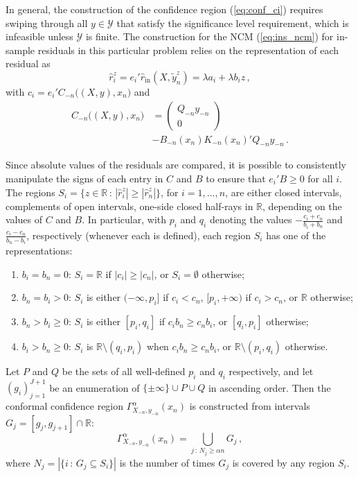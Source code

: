 \documentclass[a4paper,14pt]{extarticle}
\newcommand{\Ycal}{\mathcal{Y}}
\newcommand{\Real}{\mathbb{R}}
\begin{document}
In general, the construction of the confidence region (\ref{eq:conf_ci}) requires
swiping through all $y\in \Ycal$ that satisfy the significance level requirement,
which is infeasible unless $\Ycal$ is finite. The construction for the NCM (\ref{eq:ins_ncm})
for in-sample residuals in this particular problem relies on the representation
of each residual as
\begin{equation*}
  \hat{r}_i^z
    = e_i' \hat{r}_{\text{in}}(X, \tilde{y}_n^z)
    = \lambda a_i + \lambda b_i z
    \,,
\end{equation*}
with $c_i = e_i' C_{-n}\bigl((X, y), x_n\bigr)$ and
\begin{align*}
  C_{-n}\bigl((X, y), x_n\bigr)
    &= \begin{pmatrix} Q_{-n} y_{-n} \\ 0 \end{pmatrix} \\
    &- B_{-n}(x_n) K_{-n}(x_n)' Q_{-n} y_{-n}
    \,.
\end{align*}

Since absolute values of the residuals are compared, it is possible to consistently
manipulate the signs of each entry in $C$ and $B$ to ensure that $e_i'B\geq 0$ for
all $i$. The regions $S_i = \{z\in\Real\,:\, |\hat{r}_i^z| \geq |\hat{r}_n^z|\}$, for
$i=1,\ldots, n$, are either closed intervals, complements of open intervals,
one-side closed half-rays in $\Real$, depending on the values of $C$ and $B$. In
particular, with $p_i$ and $q_i$ denoting the values $-\frac{c_i+c_n}{b_i+b_n}$ and
$\frac{c_i-c_n}{b_n-b_i}$, respectively (whenever each is defined), each region
$S_i$ has one of the representations:
\begin{enumerate}
  \item $b_i=b_n=0$: $S_i = \Real$ if $|c_i| \geq |c_n|$, or $S_i = \emptyset$
  otherwise;
  \item $b_n = b_i > 0$: $S_i$ is either $(-\infty, p_i]$ if $c_i < c_n$, $[p_i, +\infty)$ if
  $c_i > c_n$, or $\Real$ otherwise;
  \item $b_n > b_i \geq 0$: $S_i$ is either $[p_i, q_i]$ if $c_i b_n \geq c_n b_i$,
  or $[q_i, p_i]$ otherwise;
  \item $b_i > b_n \geq 0$: $S_i$ is $\Real\setminus (q_i, p_i)$ when $c_i b_n \geq c_n b_i$,
  or $\Real\setminus (p_i, q_i)$ otherwise.
\end{enumerate}
Let $P$ and $Q$ be the sets of all well-defined $p_i$ and $q_i$ respectively, and let
$(g_i)_{j=1}^{J+1}$ be an enumeration of $\{\pm\infty\}\cup P \cup Q$ in ascending
order. Then the conformal confidence region $\Gamma_{X_{-n}, y_{-n}}^\alpha(x_n)$ is
constructed from intervals $G_j = [g_j, g_{j+1}] \cap \Real$:
\begin{equation*}\label{eq:rrcm_conf_ci}
  \Gamma_{X_{-n}, y_{-n}}^\alpha(x_n)
    = \bigcup_{j\,:\, N_j \geq \alpha n} G_j
    \,,
\end{equation*}
where $N_j = |\{i\,:\,G_j \subseteq S_i\}|$ is the number of times $G_j$ is covered by
any region $S_i$.
\end{document}
